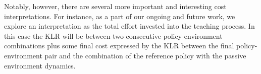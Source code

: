 Notably, however, there are several more important and interesting
cost interpretations. For instance, as a part of our ongoing and
future work, we explore an interpretation as the total effort invested
into the teaching process. In this case the KLR will be between two
consecutive policy-environment combinations plus some final cost
expressed by the KLR between the final policy-environment pair and the
combination of the reference policy with the passive environment
dynamics.

